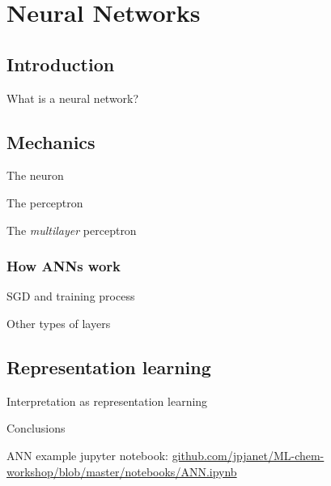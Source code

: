 



\section{Neural Networks}
%
\subsection{Introduction}
%
\begin{frame}[t]{What is a neural network?}

\end{frame}
%
\subsection{Mechanics}
%
\begin{frame}[t]{The neuron}

\end{frame}
%
\begin{frame}[t]{The perceptron}

\end{frame}
%
\begin{frame}[t]{The \textit{multilayer} perceptron}

\end{frame}
%
\begin{frame}[t]\frametitle{How ANNs work}

\end{frame}
%
\begin{frame}[t]{SGD and training process}

\end{frame}
%
\begin{frame}[t]{Other types of layers}

\end{frame}
%
\subsection{Representation learning}
%
\begin{frame}[t]{Interpretation as representation learning}

\end{frame}
%
\begin{frame}[t]{Conclusions}

\end{frame}
%
\begin{frame}{ANN example}
jupyter notebook: \url{github.com/jpjanet/ML-chem-workshop/blob/master/notebooks/ANN.ipynb}
\end{frame}